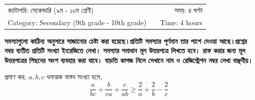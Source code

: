 \documentclass[a4paper, 10pt]{article}
\begin{document}


\begin{tabular}{lcr}
ক্যাটাগরি: সেকেন্ডারি (৯ম - ১০ম শ্রেণী)  & \hspace{34ex} & সময়: ৪ ঘণ্টা \\
Category: Secondary (9th grade - 10th grade) & & Time: 4 hours \\
\end{tabular}

\vspace{2ex}

\textbf{সমস্যাগুলো কাঠিন্য অনুসারে সাজানোর চেষ্টা করা হয়েছে।প্রতিটি সমস্যার পূর্ণমান তার পাশে দেওয়া আছে।প্রশ্নের নম্বর ব্যতীত প্রতিটি সংখ্যা ইংরেজিতে লেখা। সমস্যার সমাধান মূল উত্তরপত্রে লিখতে হবে। রাফ করার জন্য মূল উত্তরপত্রের পিছনের অংশ ব্যবহার করা যাবে। বাড়তি কাগজ নিলে সেখানে নাম ও রেজিস্ট্রেশন নম্বর লেখা বাঞ্ছনীয়।}

\begin{problem}
প্রমাণ কর, $a,b,c$ ধনাত্মক বাস্তব সংখ্যা হলে,
$$\dfrac{a}{bc}+\dfrac{b}{ca}+\dfrac{c}{ab}\ge \dfrac{2}{a}+\dfrac{2}{b}-\dfrac{2}{c}$$
\end{problem}
\end{document}
